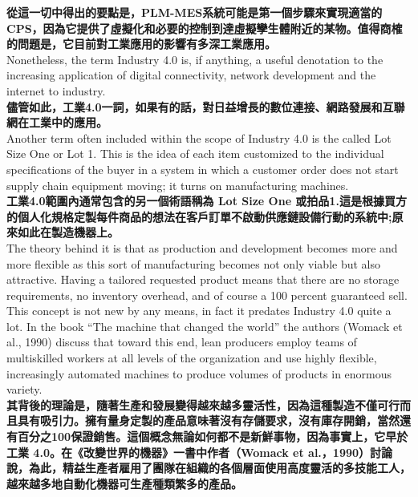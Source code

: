 \documentclass[24pt]{article} %
\begin{document}
\textbf{從這一切中得出的要點是，PLM-MES系統可能是第一個步驟來實現適當的CPS，因為它提供了虛擬化和必要的控制到達虛擬孿生體附近的某物。值得商榷的問題是，它目前對工業應用的影響有多深工業應用。}\\

Nonetheless, the term Industry 4.0 is, if anything, a useful denotation to the increasing application of digital connectivity, network development and the internet to industry.\\

\textbf{儘管如此，工業4.0一詞，如果有的話，對日益增長的數位連接、網路發展和互聯網在工業中的應用。}\\

Another term often included within the scope of Industry 4.0 is the called Lot Size One or Lot 1. This is the idea of each item customized to the individual specifications of the buyer in a system in which a customer order does not start supply chain equipment moving; it turns on manufacturing machines. \\

\textbf{工業4.0範圍內通常包含的另一個術語稱為 Lot Size One 或拍品1.這是根據買方的個人化規格定製每件商品的想法在客戶訂單不啟動供應鏈設備行動的系統中;原來如此在製造機器上。}\\

The theory behind it is that as production and development becomes more and more flexible as this sort of manufacturing becomes not only viable but also attractive. Having a tailored requested product means that there are no storage requirements, no inventory overhead, and of course a 100 percent guaranteed sell. This concept is not new by any means, in fact it predates Industry 4.0 quite a lot. In the book “The machine that changed the world” the authors (Womack et al., 1990) discuss that toward this end, lean producers employ teams of multiskilled workers at all levels of the organization and use highly flexible, increasingly automated machines to produce volumes of products in enormous variety.\\

\textbf{其背後的理論是，隨著生產和發展變得越來越多靈活性，因為這種製造不僅可行而且具有吸引力。擁有量身定製的產品意味著沒有存儲要求，沒有庫存開銷，當然還有百分之100保證銷售。這個概念無論如何都不是新鮮事物，因為事實上，它早於工業 4.0。在《改變世界的機器》一書中作者（Womack et al.，1990）討論說，為此，精益生產者雇用了團隊在組織的各個層面使用高度靈活的多技能工人，越來越多地自動化機器可生產種類繁多的產品。}\\
\end{document}
